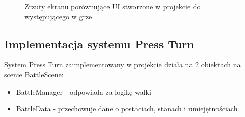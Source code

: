 \documentclass{SGGW-thesis}
\begin{document}
\begin{figure}[H]
  \hfill
  \hfill
  \hfill
  \caption{Zrzuty ekranu porównujące UI stworzone w projekcie do występującego w grze \cite{SMT3}}
\end{figure}

\subsection{Implementacja systemu Press Turn}
System Press Turn zaimplementowany w projekcie działa na 2 obiektach na scenie BattleScene:
\begin{itemize}
  \item{BattleManager - odpowiada za logikę walki}
  \item{BattleData - przechowuje dane o postaciach, stanach i umiejętnościach}
\end{itemize}
\end{document}
